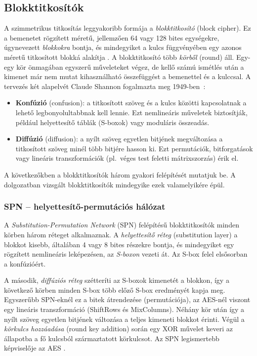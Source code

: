 \documentclass[a4paper,12pt]{report}
\theoremstyle{definition}
\theoremstyle{remark}
\begin{document}
\subsection{Blokktitkosítók}

A szimmetrikus titkosítás leggyakoribb formája a \emph{blokktitkosító} (block cipher). Ez a bemenetet rögzített méretű, jellemzően 64 vagy 128 bites egységekre, úgynevezett \emph{blokkokra} bontja, és mindegyiket a kulcs függvényében egy azonos méretű titkosított blokká alakítja \cite{Paar2010}. A blokktitkosító több \emph{körből} (round) áll. Egy-egy kör önmagában egyszerű műveleteket végez, de kellő számú ismétlés után a kimenet már nem mutat kihasználható összefüggést a bemenettel és a kulccsal. A tervezés két alapelvét Claude Shannon fogalmazta meg 1949-ben~\cite{Shannon1949}:

\begin{itemize}
	\item \textbf{Konfúzió} (confusion): a titkosított szöveg és a kulcs közötti kapcsolatnak a lehető legbonyolultabbnak kell lennie. Ezt nemlineáris műveletek biztosítják, például helyettesítő táblák (S-boxok) vagy moduláris összeadás.
	\item \textbf{Diffúzió} (diffusion): a nyílt szöveg egyetlen bitjének megváltozása a titkosított szöveg minél több bitjére hasson ki. Ezt permutációk, bitforgatások vagy lineáris transzformációk (pl.~véges test feletti mátrixszorzás) érik el.
\end{itemize}

A következőkben a blokktitkosítók három gyakori felépítését mutatjuk be. A dolgozatban vizsgált blokktitkosítók mindegyike ezek valamelyikére épül.

\subsubsection{SPN -- helyettesítő-permutációs hálózat}

A \emph{Substitution-Permutation Network} (SPN) felépítésű blokktitkosítók minden körben három réteget alkalmaznak. A \emph{helyettesítő réteg} (substitution layer) a blokkot kisebb, általában 4 vagy 8 bites részekre bontja, és mindegyiket egy rögzített nemlineáris leképezésen, az \emph{S-boxon} vezeti át. Az S-box felel elsősorban a konfúzióért.

A második, \emph{diffúziós réteg} szétteríti az S-boxok kimenetét a blokkon, így a következő körben minden S-box több előző S-box eredményét kapja meg. Egyszerűbb SPN-eknél ez a bitek átrendezése (permutációja), az AES-nél viszont egy lineáris transzformáció (ShiftRows és MixColumns). Néhány kör után így a nyílt szöveg egyetlen bitjének változása a teljes kimeneti blokkot érinti. Végül a \emph{körkulcs hozzáadása} (round key addition) során egy XOR művelet keveri az állapotba a fő kulcsból származtatott körkulcsot. Az SPN legismertebb képviselője az AES \cite{DaemenRijmen2002}.
\end{document}
